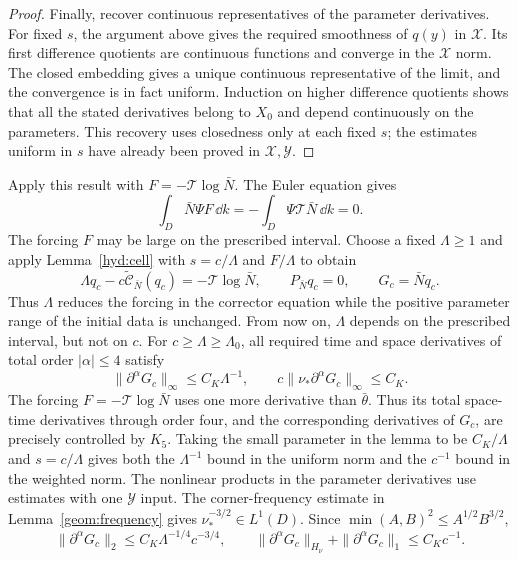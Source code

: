 \begin{proof}
 Finally, recover continuous representatives of the parameter
 derivatives. For fixed $s$, the argument above gives the required
 smoothness of $q(y)$ in $\mathcal X$. Its first difference quotients
 are continuous functions and converge in the $\mathcal X$ norm. The
 closed embedding gives a unique continuous representative of the
 limit, and the convergence is in fact uniform. Induction on higher
 difference quotients shows that all the stated derivatives belong to
 $X_0$ and depend continuously on the parameters. This recovery uses
 closedness only at each fixed $s$; the estimates uniform in $s$ have
 already been proved in $\mathcal X,\mathcal Y$.
\end{proof}

Apply this result with $F=-\mathcal T\log\bar N$. The Euler equation gives
\[
 \int_D\bar N\Psi F\,\dd k=-\int_D\Psi\mathcal T\bar N\,\dd k=0.
\]
The forcing $F$ may be large on the prescribed interval. Choose a fixed
$\Lambda\ge1$ and apply Lemma~\ref{hyd:cell} with $s=c/\Lambda$ and
$F/\Lambda$ to obtain
\begin{equation}\label{hyd:cell-Lambda}
 \Lambda q_c-c\widetilde{\mathcal C}_{\bar N}(q_c)
      =-\mathcal T\log\bar N,
 \qquad P_{\bar N}q_c=0,
 \qquad G_c=\bar Nq_c.
\end{equation}
Thus $\Lambda$ reduces the forcing in the corrector equation while the
positive parameter range of the initial data is unchanged. From now on,
$\Lambda$ depends on the prescribed interval, but not on $c$. For
$c\ge\Lambda\ge\Lambda_0$, all required time and space derivatives of
total order $|\alpha|\le4$ satisfy
\begin{equation}\label{hyd:G-two-norms}
 \|\partial^\alpha G_c\|_\infty\le C_K\Lambda^{-1},
 \qquad c\|\nu_*\partial^\alpha G_c\|_\infty\le C_K.
\end{equation}
The forcing $F=-\mathcal T\log\bar N$ uses one more derivative than
$\bar\theta$. Thus its total space-time derivatives through order four,
and the corresponding derivatives of $G_c$, are precisely controlled by
$K_5$. Taking the small parameter in the lemma to be $C_K/\Lambda$ and
$s=c/\Lambda$ gives both the $\Lambda^{-1}$ bound in the uniform norm
and the $c^{-1}$ bound in the weighted norm. The nonlinear products in
the parameter derivatives use estimates with one $\mathcal Y$ input.
The corner-frequency estimate in Lemma~\ref{geom:frequency} gives
$\nu_*^{-3/2}\in L^1(D)$. Since
$\min(A,B)^2\le A^{1/2}B^{3/2}$,
\begin{equation}\label{hyd:G-integral}
 \|\partial^\alpha G_c\|_2\le C_K\Lambda^{-1/4}c^{-3/4},
 \qquad
 \|\partial^\alpha G_c\|_{H_\nu}
       +\|\partial^\alpha G_c\|_1\le C_Kc^{-1}.
\end{equation}
